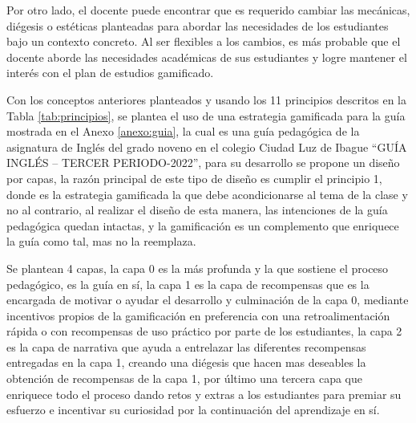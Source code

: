 Por otro lado, el docente puede encontrar que es requerido cambiar las mecánicas, diégesis o estéticas 
planteadas para abordar las necesidades de los estudiantes bajo un contexto concreto. Al ser flexibles a los 
cambios, es más probable que el docente aborde las necesidades académicas de sus estudiantes y logre mantener 
el interés con el plan de estudios gamificado.

Con los conceptos anteriores planteados y usando los 11 principios descritos en la Tabla \ref{tab:principios}, 
se plantea el uso de una estrategia gamificada para la guía mostrada en el Anexo \ref{anexo:guia}, la cual es 
una guía pedagógica de la asignatura de Inglés del grado noveno en el colegio Ciudad Luz de Ibague ``GUÍA 
INGLÉS – TERCER PERIODO-2022'', para su desarrollo se propone un diseño por capas, la razón principal de este 
tipo de diseño es cumplir el principio 1, donde es la estrategia gamificada la que debe acondicionarse al tema 
de la clase y no al contrario, al realizar el diseño de esta manera, las intenciones de la guía pedagógica 
quedan intactas, y la gamificación es un complemento que enriquece la guía como tal, mas no la reemplaza.

Se plantean 4 capas, la capa 0 es la más profunda y la que sostiene el proceso pedagógico, es la guía en sí, 
la capa 1 es la capa de recompensas que es la encargada de motivar o ayudar el desarrollo y culminación de la 
capa 0, mediante incentivos propios de la gamificación en preferencia con una retroalimentación rápida o con 
recompensas de uso práctico por parte de los estudiantes, la capa 2 es la capa de narrativa que ayuda a 
entrelazar las diferentes recompensas entregadas en la capa 1, creando una diégesis que hacen mas deseables la 
obtención de recompensas de la capa 1, por último una tercera capa que enriquece todo el proceso dando retos y 
extras a los estudiantes para premiar su esfuerzo e incentivar su curiosidad por la continuación del 
aprendizaje en sí.


